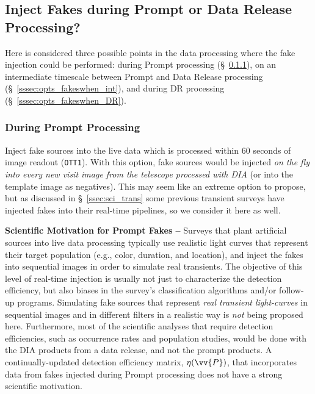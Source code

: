 
\subsection{Inject Fakes during Prompt or Data Release Processing?}\label{ssec:opts_fakeswhen}

Here is considered three possible points in the data processing where the fake injection could be performed: during Prompt processing (\S~\ref{sssec:opts_fakeswhen_PP}), on an intermediate timescale between Prompt and Data Release processing (\S~\ref{sssec:opts_fakeswhen_int}), and during DR processing (\S~\ref{sssec:opts_fakeswhen_DR}).

\subsubsection{During Prompt Processing}\label{sssec:opts_fakeswhen_PP}

Inject fake sources into the live data which is processed within 60 seconds of image readout ({\tt OTT1}). With this option, fake sources would be injected {\it on the fly into every new visit image from the telescope processed with DIA} (or into the template image as negatives). This may seem like an extreme option to propose, but as discussed in \S~\ref{ssec:sci_trans} some previous transient surveys have injected fakes into their real-time pipelines, so we consider it here as well. 

{\bf Scientific Motivation for Prompt Fakes --} Surveys that plant artificial sources into live data processing typically use realistic light curves that represent their target population (e.g., color, duration, and location), and inject the fakes into sequential images in order to simulate real transients. The objective of this level of real-time injection is usually not just to characterize the detection efficiency, but also biases in the survey's classification algorithms and/or follow-up programs. Simulating fake sources that represent {\it real transient light-curves} in sequential images and in different filters in a realistic way is {\it not} being proposed here. Furthermore, most of the scientific analyses that require detection efficiencies, such as occurrence rates and population studies, would be done with the DIA products from a data release, and not the prompt products. A continually-updated detection efficiency matrix, $\eta(\vv{P})$, that incorporates data from fakes injected during Prompt processing does not have a strong scientific motivation.

